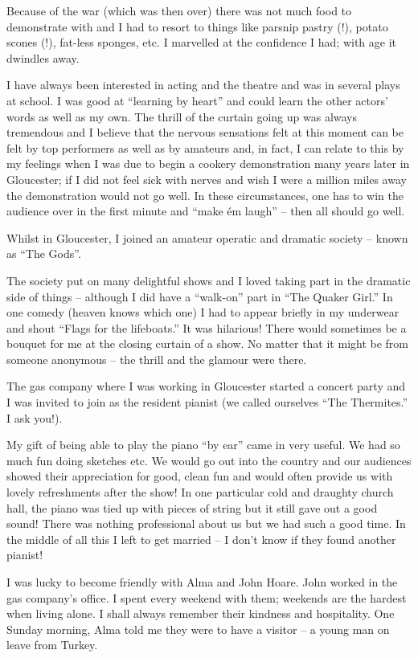 Because of the war (which was then over) there was not much food to
demonstrate with and I had to resort to things like parsnip pastry
(!), potato scones (!), fat-less sponges, etc. I marvelled at the
confidence I had; with age it dwindles away.

I have always been interested in acting and the theatre and was in
several plays at school. I was good at ``learning by heart'' and could
learn the other actors' words as well as my own. The thrill of the
curtain going up was always tremendous and I believe that the nervous
sensations felt at this moment can be felt by top performers as well
as by amateurs and, in fact, I can relate to this by my feelings when
I was due to begin a cookery demonstration many years later in
Gloucester; if I did not feel sick with nerves and wish I were a
million miles away the demonstration would not go well. In these
circumstances, one has to win the audience over in the first minute
and ``make \'em laugh'' -- then all should go well.

Whilst in Gloucester, I joined an amateur operatic and dramatic
society -- known as ``The Gods''.

The society put on many delightful shows and I loved taking part in
the dramatic side of things -- although I did have a ``walk-on'' part
in ``The Quaker Girl.'' In one comedy (heaven knows which one) I had
to appear briefly in my underwear and shout ``Flags for the
lifeboats.'' It was hilarious! There would sometimes be a bouquet for
me at the closing curtain of a show. No matter that it might be from
someone anonymous -- the thrill and the glamour were there.

The gas company where I was working in Gloucester started a concert
party and I was invited to join as the resident pianist (we called
ourselves ``The Thermites.'' I ask you!).

My gift of being able to play the piano ``by ear'' came in very
useful. We had so much fun doing sketches etc. We would go out into
the country and our audiences showed their appreciation for good,
clean fun and would often provide us with lovely refreshments after
the show! In one particular cold and draughty church hall, the piano
was tied up with pieces of string but it still gave out a good sound!
There was nothing professional about us but we had such a good
time. In the middle of all this I left to get married -- I don't know
if they found another pianist!

I was lucky to become friendly with Alma and John Hoare. John worked
in the gas company's office. I spent every weekend with them; weekends
are the hardest when living alone. I shall always remember their
kindness and hospitality. One Sunday morning, Alma told me they were
to have a visitor -- a young man on leave from Turkey.

